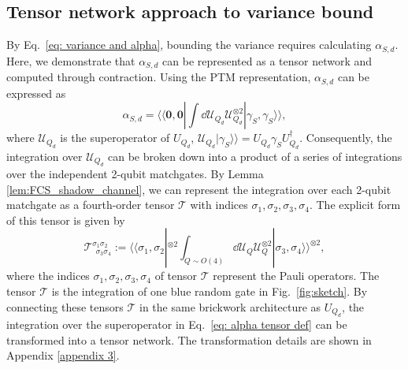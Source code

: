 \documentclass[journal=jctcce,a4paper,manuscript=article]{achemso}
\newcommand{\supket}[1]{|#1 \rangle\rangle}
\newcommand{\supbra}[1]{\langle\langle #1 |}
\newcommand{\Tcal}{\mathcal{T}}
\newcommand{\Ucal}{\mathcal{U}}
\begin{document}
\subsection{Tensor network approach to variance bound}
\label{sec: tensornet of alpha}
By Eq.~\eqref{eq: variance and alpha}, bounding the variance requires calculating $\alpha_{S,d}$. Here, we demonstrate that $\alpha_{S,d}$ can be represented as a tensor network and computed through contraction.
Using the PTM representation, $\alpha_{S,d}$ can be expressed as
\begin{equation}
  \label{eq: alpha tensor def}
  \alpha_{S,d} = \supbra{\bm 0,\bm 0}  \int \dd \Ucal_{Q_d} \mathcal{U}_{Q_d}^{\otimes 2} \supket{\gamma_S, \gamma_S},
\end{equation}
where $\mathcal{U}_{Q_d}$ is the superoperator of ${U}_{Q_d}$, $\mathcal{U}_{Q_d} \supket{\gamma_S} = U_{Q_d} \gamma_S U_{Q_d}^\dagger$.
Consequently, the integration over $\Ucal_{Q_d}$ can be broken down into a product of a series of integrations over the independent 2-qubit matchgates.
By Lemma \ref{lem:FCS_shadow_channel}, we can represent the integration over each 2-qubit matchgate as a fourth-order tensor $\Tcal$ with indices $\sigma_1,\sigma_2, \sigma_3, \sigma_4$. The explicit form of this tensor is given by
\begin{equation}
  \label{eq: T}
  \Tcal^{\sigma_1\sigma_2}_{~~\sigma_3\sigma_4} := \supbra{\sigma_1, \sigma_2}^{\otimes 2}  \int_{Q\sim O(4)} \dd \Ucal_{Q} \mathcal{U}_{Q}^{\otimes 2} \supket{\sigma_3, \sigma_4}^{\otimes 2} ,
\end{equation}
where the indices $\sigma_1, \sigma_2, \sigma_3, \sigma_4$ of tensor $\Tcal$ represent the Pauli operators. The tensor $\Tcal$ is the integration of one blue random gate in Fig.~\ref{fig:sketch}.
By connecting these tensors $\Tcal$ in the same brickwork architecture as $ U_{Q_d} $, the integration over the superoperator in Eq.~\eqref{eq: alpha tensor def} can be transformed into a tensor network. The transformation details are shown in Appendix \ref{appendix 3}.
\end{document}
